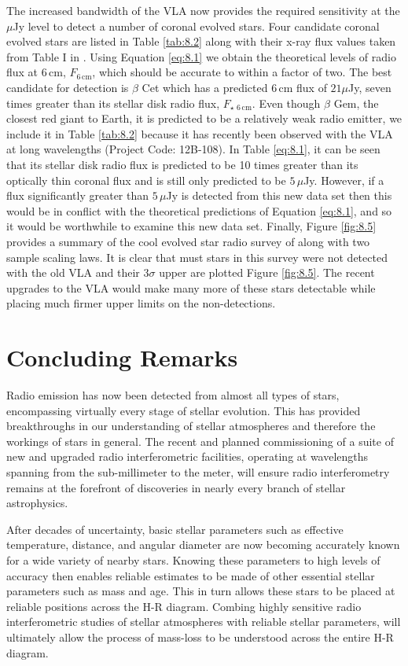 The increased bandwidth of the VLA now provides the required sensitivity at the $\mu$Jy level to detect a number of coronal evolved stars. Four candidate coronal evolved stars are listed in Table \ref{tab:8.2} along with their x-ray flux values taken from Table I in \cite{drake_1986}. Using Equation \ref{eq:8.1} we obtain the theoretical levels of radio flux at 6\,cm, $F_{6\,\mathrm{cm}}$,  which should be accurate to within a factor of two. The best candidate for detection is $\beta$ Cet which has a predicted 6\,cm flux of $21\mu$Jy, seven times greater than its stellar disk radio flux, $F_{\star \,\,6\,\mathrm{cm}}$. Even though $\beta$ Gem, the closest red giant to Earth, it is predicted to be a relatively weak radio emitter, we include it in Table \ref{tab:8.2} because it has recently been observed with the VLA at long wavelengths (Project Code: 12B-108). In Table \ref{eq:8.1}, it can be seen that its stellar disk radio flux is predicted to be 10 times greater than its optically thin coronal flux and is still only predicted to be $5\,\mu$Jy. However, if a flux significantly greater than $5\,\mu$Jy is detected from this new data set then this would be in conflict with the theoretical predictions of Equation \ref{eq:8.1}, and so it would be worthwhile to examine this new data set. Finally, Figure \ref{fig:8.5} provides a summary of the cool evolved star radio survey of \cite{drake_1986} along with two sample scaling laws. It is clear that must stars in this survey were not detected with the old VLA and their $3\sigma$ upper are plotted Figure \ref{fig:8.5}. The recent upgrades to the VLA would make many more of these stars detectable while placing much firmer upper limits on the non-detections. 

\section{Concluding Remarks}\label{sec:8.3}
Radio emission has now been detected from almost all types of stars, encompassing virtually every stage of stellar evolution. This has provided breakthroughs in our understanding of stellar atmospheres and therefore the workings of stars in general. The recent and planned commissioning of a suite of new and upgraded radio interferometric facilities, operating at wavelengths spanning from the sub-millimeter to the meter, will ensure radio interferometry remains at the forefront of discoveries in nearly every branch of stellar astrophysics. 

After decades of uncertainty, basic stellar parameters such as effective temperature, distance, and angular diameter are now becoming accurately known for a wide variety of nearby stars. Knowing these parameters to high levels of accuracy then enables reliable estimates to be made of other essential stellar parameters such as mass and age. This in turn allows these stars to be placed at reliable positions across the H-R diagram. Combing highly sensitive radio interferometric studies of stellar atmospheres with reliable stellar parameters, will ultimately allow the process of mass-loss to be understood across the entire H-R diagram.


